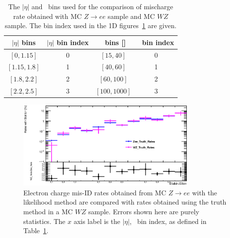 \begin{table}[htp]
\centering

\begin{tabular}{c|c||c|c}
	 \hline
	  $|\eta|$ bins & $|\eta|$ bin index   & \pt\ bins [\GeV] & \pt\ bin index \\
 	 \hline
	  $[0, 1.15]   $   & 0 	   &  $[15, 40]$ & 0 \\
	  $[1.15, 1.8] $   & 1 	   &  $[40, 60]$ & 1 \\
	  $[1.8, 2.2] $   & 2	   &  $[60, 100]$ & 2 \\
	  $[2.2, 2.5] $   & 3 	   &  $[100, 1000]$ & 3 \\

  \hline
\end{tabular}
\caption{The $|\eta|$ and \pt\ bins used for the comparison of mischarge
  rate obtained with MC $Z\to{}ee$ sample and MC $WZ$ sample. The bin index used in the 1D figures~\ref{fig:ChargeMisID_truthRate_Zee_WZ} are given.}
\label{tab:Etbin and Etabin of mis-charge rate for WZ comparisons}
\end{table}



 \begin{figure}[htp]
 \centering
 \includegraphics[width=0.8\textwidth]{figures/ChargeMisID/Validation_ChargeMisIDRates_PTvsEta_CompareSSRate.eps}
 \caption{Electron charge mis-ID rates obtained from MC $Z\to{}ee$ with the likelihood method are compared with rates obtained using the truth method in a MC $WZ$ sample. Errors shown here are purely statistics. The $x$ axis label is
  the $|\eta|$, \pt\ bin index, as defined in Table~\ref{tab:Etbin and Etabin of mis-charge rate for WZ comparisons}.}
 \label{fig:ChargeMisID_truthRate_Zee_WZ}
 \end{figure}


